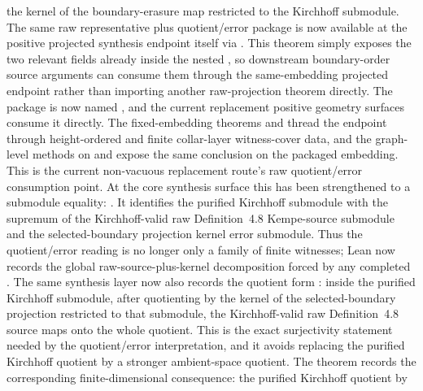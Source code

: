 \documentclass[11pt]{article}
\begin{document}
\begin{itemize}
the kernel of the boundary-erasure map restricted to the Kirchhoff submodule.
The same raw representative plus quotient/error package is now available at the
positive projected synthesis endpoint itself via
.
This theorem simply exposes the two relevant fields already inside the nested
, so downstream boundary-order source
arguments can consume them through the same-embedding projected endpoint rather
than importing another raw-projection theorem directly.
The package is now named
, and the current replacement
positive geometry surfaces consume it directly.  The fixed-embedding theorems
and
thread the endpoint through height-ordered and finite collar-layer witness-cover
data, and the graph-level methods on
 and
 expose the same conclusion
on the packaged embedding.  This is the current non-vacuous replacement route's
raw quotient/error consumption point.
At the core synthesis surface this has been strengthened to a submodule
equality:
.
It identifies the purified Kirchhoff submodule with the supremum of the
Kirchhoff-valid raw Definition~4.8 Kempe-source submodule and the
selected-boundary projection kernel error submodule.  Thus the quotient/error
reading is no longer only a family of finite witnesses; Lean now records the
global raw-source-plus-kernel decomposition forced by any completed
.
The same synthesis layer now also records the quotient form
: inside the purified
Kirchhoff submodule, after quotienting by the kernel of the selected-boundary
projection restricted to that submodule, the Kirchhoff-valid raw
Definition~4.8 source maps onto the whole quotient.  This is the exact
surjectivity statement needed by the quotient/error interpretation, and it
avoids replacing the purified Kirchhoff quotient by a stronger ambient-space
quotient.
The theorem
 records the
corresponding finite-dimensional consequence: the purified Kirchhoff quotient by

\end{itemize}
\end{document}
